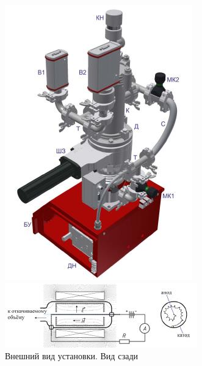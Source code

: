 \documentclass[12pt,a4paper]{article}
\begin{document}
\begin{figure}[h!]
\begin{center}
\begin{minipage}[h]{0.4\linewidth}
				\label{fig:scem_of_facility_front} %
			\end{minipage}
		\hfill
			\begin{minipage}[h]{0.4\linewidth}
				\includegraphics[width=1\linewidth]{scem_of_facility_rear}
				\caption{Внешний вид установки. Вид сзади}
				\label{fig:scem_of_facility_rear}
			\end{minipage}
		\end{center}
		\begin{center}
			\begin{minipage}[h]{0.7\linewidth}
				\includegraphics[width=1\linewidth]{Scem_of_vacuummetres}

\end{minipage}
\end{center}
\end{figure}
\end{document}
